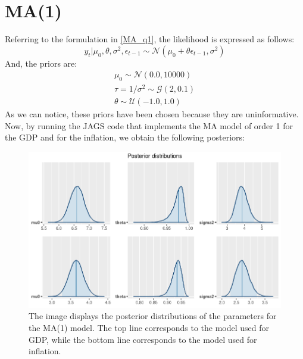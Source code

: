 \section*{MA(1)}
\label{MA(1)}
Referring to the formulation in \ref{MA_q1}, the likelihood is expressed as follows:
$$
y_t | \mu_0, \theta, \sigma^2, \epsilon_{t-1} \sim \mathcal{N}(\mu_0 + \theta \epsilon_{t-1},\sigma^2)
$$
And, the priors are:
\begin{equation}
    \begin{split}
        \mu_0 \sim \mathcal{N}(0.0, 10000) \\
        \tau = 1 / \sigma^2 \sim \mathcal{G}(2, 0.1) \\
        \theta \sim \mathcal{U}(-1.0, 1.0)
    \end{split}
\end{equation}
As we can notice, these priors have been chosen because they are uninformative. \\
Now, by running the JAGS code that implements the MA model of order 1 for the GDP and for the inflation, we obtain the following posteriors:
\begin{figure}[H]
    \centering
    \includegraphics[width=\textwidth]{images/3-MA/posteriors.png}
    \caption{The image displays the posterior distributions of the parameters for the MA(1) model. The top line corresponds to the model used for GDP, while the bottom line corresponds to the model used for inflation.}
    \label{fig:MA_posteriors}
\end{figure}

